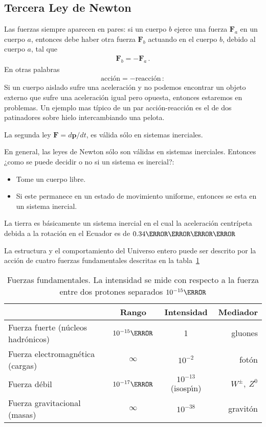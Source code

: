 \subsection{Tercera Ley de Newton}
Las fuerzas siempre aparecen en pares: si un cuerpo $b$ ejerce una fuerza $\mathbf{F}_a$ en un cuerpo $a$, entonces debe haber otra fuerza $\mathbf{F}_b$ actuando en el cuerpo $b$, debido al cuerpo $a$, tal que
\begin{align}
  \mathbf{F}_b=-\mathbf{F}_a\,.
\end{align}
En otras palabras
\begin{align}
  \text{acci\'on}=-\text{reacci\'on}\,:
\end{align}
Si un cuerpo aislado sufre una aceleraci\'on y no podemos encontrar un objeto externo que sufre una aceleraci\'on igual pero opuesta, entonces estaremos en problemas. Un ejemplo mas típico de un par acción-reacción es el de dos patinadores sobre hielo intercambiando una pelota.

La segunda ley $\mathbf{F}=d\mathbf{p}/dt$,  es válida sólo en sistemas inerciales.

En general, las leyes de Newton sólo son válidas en sistemas inerciales. Entonces ¿como se puede decidir o no si un sistema es inercial?:
\begin{itemize}
\item Tome un cuerpo libre.
\item Si este permanece en un estado de movimiento uniforme, entonces se esta en un sistema inercial.
\end{itemize}

La tierra es b\'asicamente un sistema inercial en el cual la aceleración centrípeta debida a la rotación en el Ecuador es de $0.34\meter\per\second\squared$

La estructura y el comportamiento del Universo entero puede ser descrito por la acción de cuatro fuerzas fundamentales descritas en la tabla~\ref{tab:forces}
\begin{table}
  \centering
  \begin{tabular}{l|cc|r}
    &Rango& Intensidad&Mediador\\\hline
Fuerza fuerte (n\'ucleos hadr\'onicos) & $10^{-15}\meter$ &1 &gluones\\
Fuerza electromagn\'etica (cargas) & $\infty$ & $10^{-2}$ & fot\'on\\
Fuerza d\'ebil &$10^{-17}\meter$&$10^{-13}$ (isosp\'\i n)& $W^\pm,\ Z^0$\\
Fuerza gravitacional (masas)&$\infty$& $10^{-38}$& gravit\'on\\
  \end{tabular}
  \caption{Fuerzas fundamentales. La intensidad se mide con respecto a la fuerza entre dos protones separados $10^{-15}\meter$}
  \label{tab:forces}
\end{table}



